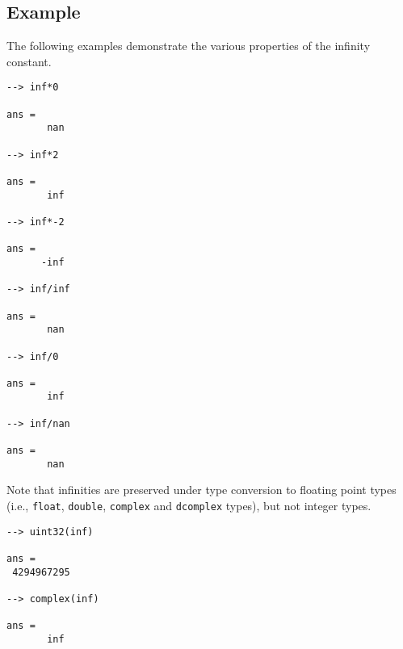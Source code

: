 \subsection{Example}

The following examples demonstrate the various properties of the infinity constant.
\begin{verbatim}
--> inf*0

ans = 
       nan 

--> inf*2

ans = 
       inf 

--> inf*-2

ans = 
      -inf 

--> inf/inf

ans = 
       nan 

--> inf/0

ans = 
       inf 

--> inf/nan

ans = 
       nan 
\end{verbatim}
Note that infinities are preserved under type conversion to floating point types (i.e., \verb|float|, \verb|double|, \verb|complex| and \verb|dcomplex| types), but not integer  types.
\begin{verbatim}
--> uint32(inf)

ans = 
 4294967295 

--> complex(inf)

ans = 
       inf 
\end{verbatim}
